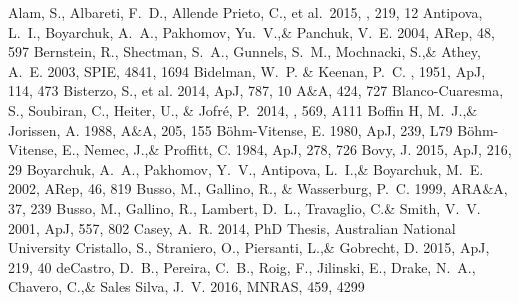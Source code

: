 \documentclass[a4paper,fleqn,usenatbib]{mnras}
\begin{document}
 


\begin{thebibliography}{99}
 Alam, S., Albareti, F.~D., Allende Prieto, C., et al.\ 2015, \apjs, 219, 12 
Antipova, L.~I., Boyarchuk, A.~A., Pakhomov, Yu.~V.,\& Panchuk, V.~E. 2004, 
ARep, 48, 597
Bernstein, R., Shectman, S.~A., Gunnels, S.~M., Mochnacki, S.,\& Athey, A.~E. 2003, 
SPIE, 4841, 1694    
Bidelman, W.~P. \& Keenan, P.~C. , 1951, ApJ, 114, 473
Bisterzo, S., et al. 2014, 
ApJ, 787, 10
A$\&$A, 424, 727
 Blanco-Cuaresma, S., Soubiran, C., Heiter, U., \& Jofr{\'e}, P.\ 2014, \aap, 569, A111 
Boffin H, M.~J.,\& Jorissen, A. 1988, 
A$\&$A, 205, 155
B\"ohm-Vitense, E. 1980, 
ApJ, 239, L79
B\"ohm-Vitense, E., Nemec, J.,\& Proffitt, C. 1984, 
ApJ, 278, 726
Bovy, J. 2015, 
ApJ, 216, 29
Boyarchuk, A.~A., Pakhomov, Y.~V., Antipova, L.~I.,\& Boyarchuk, M.~E. 2002, 
ARep, 46, 819
Busso, M., Gallino, R., \& Wasserburg, P.~C. 1999, 
ARA$\&$A, 37, 239
Busso, M., Gallino, R., Lambert, D.~L., Travaglio, C.\& Smith, V.~V. 2001, 
ApJ, 557, 802
Casey, A.~R. 2014, 
PhD Thesis, Australian National University
Cristallo, S., Straniero, O., Piersanti, L.,\& Gobrecht, D. 2015, 
ApJ, 219, 40
deCastro, D.~B., Pereira, C.~B., Roig, F., Jilinski, E., Drake, N.~A., Chavero, C.,\& Sales Silva, J.~V. 2016, 
MNRAS, 459, 4299

\end{thebibliography}
\end{document}

